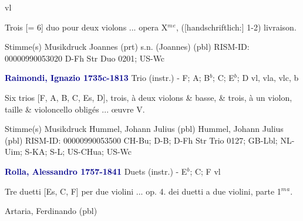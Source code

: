 \documentclass[twocolumn]{book}
\begin{document}
 vl
\newline \begin{itshape}Trois [= 6] duo pour deux violons ... opera X$^m$$^e$, ([handschriftlich:] 1-2) livraison.\end{itshape} 
\newline \textcolor{darkblue}{}  Stimme(s)
\newline Musikdruck
\newline Joannes  (prt)
\newline s.n. (Joannes)  (pbl)
\newline RISM-ID: 00000990053020
\newline D-Fh  Str Duo 0201; US-Wc
\newline \par \vspace{7pt} \textcolor{darkblue}{\textbf{Raimondi, Ignazio  1735c-1813}}
\newline Trio (instr.) - F; A; B$^b$; C; E$^b$; D
 vl, vla, vlc, b
\newline \begin{itshape}Six trios [F, A, B, C, Es, D], trois, à deux violons \& basse, \& trois, à un violon, taille \& violoncello obligés ... œuvre V.\end{itshape} 
\newline \textcolor{darkblue}{}  Stimme(s)
\newline Musikdruck
\newline Hummel, Johann Julius  (pbl)
\newline Hummel, Johann Julius  (pbl)
\newline RISM-ID: 00000990053500
\newline CH-Bu; D-B; D-Fh  Str Trio 0127; GB-Lbl; NL-Uim; S-KA; S-L; US-CHua; US-Wc
\newline \par \vspace{7pt} \textcolor{darkblue}{\textbf{Rolla, Alessandro  1757-1841}}
\newline Duets (instr.) - E$^b$; C; F
 vl
\newline \begin{itshape}Tre duetti [Es, C, F] per due violini ... op. 4. dei duetti a due violini, parte 1$^m$$^a$.\end{itshape} 
\newline Artaria, Ferdinando  (pbl)
\end{document}
